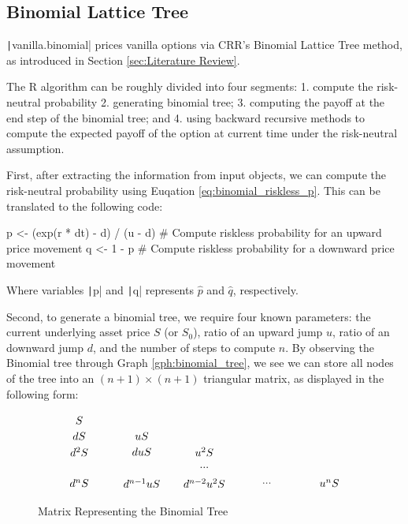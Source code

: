 \subsection{Binomial Lattice Tree}

\texttt|vanilla.binomial| prices vanilla options via CRR's Binomial Lattice Tree method, as introduced in Section \ref{sec:Literature Review}.

The R algorithm can be roughly divided into four segments: 1. compute the risk-neutral probability 2. generating binomial tree; 3. computing the payoff at the end step of the binomial tree; and 4. using backward recursive methods to compute the expected payoff of the option at current time under the risk-neutral assumption.

First, after extracting the information from input objects, we can compute the risk-neutral probability using Euqation \ref{eq:binomial_riskless_p}. This can be translated to the following code:

\begin{Rminted}
p <- (exp(r * dt) - d) / (u - d) # Compute riskless probability for an upward price movement
q <- 1 - p # Compute riskless probability for a downward price movement
\end{Rminted}

Where variables \texttt|p| and \texttt|q| represents $\hat{p}$ and $\hat{q}$, respectively.

Second, to generate a binomial tree, we require four known parameters: the current underlying asset price $S$ (or $S_0$), ratio of an upward jump $u$, ratio of an downward jump $d$, and the number of steps to compute $n$. By observing the Binomial tree through Graph \ref{gph:binomial_tree}, we see we can store all nodes of the tree into an $(n+1)\times (n+1)$ triangular matrix, as displayed in the following form:

\begin{figure}[H]
    \centering
    \[\tikz{
        \node (a) at (0, 2) {$S$};
        \node (b) at (0, 1.5) {$dS$};
        \node (c) at (2, 1.5) {$uS$};
        \node (d) at (0, 1) {$d^2S$};
        \node (e) at (2, 1) {$duS$};
        \node (f) at (4, 1) {$u^2S$};
        \node (g) at (4, 0.5) {$...$};
        \node (h) at (0, 0) {$d^nS$};
        \node (i) at (2, 0) {$d^{n-1}uS$};
        \node (j) at (4, 0) {$d^{n-2}u^2S$};
        \node (k) at (6, 0) {$...$};
        \node (l) at (8, 0) {$u^nS$};
    }\]
    \caption{Matrix Representing the Binomial Tree} \label{gph:tree_matrix}
\end{figure}

